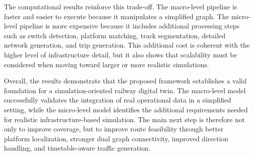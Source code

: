 The computational results reinforce this trade-off. The macro-level pipeline is faster and easier to execute because it 
manipulates a simplified graph. The micro-level pipeline is more expensive because it includes additional processing steps 
such as switch detection, platform matching, track segmentation, detailed network generation, and trip generation. This 
additional cost is coherent with the higher level of infrastructure detail, but it also shows that scalability must be 
considered when moving toward larger or more realistic simulations.

Overall, the results demonstrate that the proposed framework establishes a valid foundation for a simulation-oriented 
railway digital twin. The macro-level model successfully validates the integration of real operational data in a simplified 
setting, while the micro-level model identifies the additional requirements needed for realistic infrastructure-based 
simulation. The main next step is therefore not only to improve coverage, but to improve route feasibility through better 
platform localization, stronger dual graph connectivity, improved direction handling, and timetable-aware traffic 
generation.